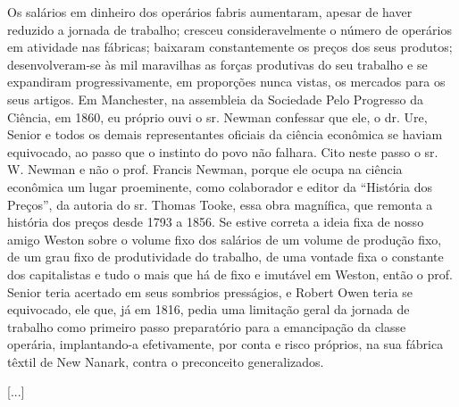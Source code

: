 Os salários em dinheiro dos operários fabris aumentaram, apesar de haver reduzido a jornada de trabalho; cresceu consideravelmente o número de operários em atividade nas fábricas; baixaram constantemente os preços dos seus produtos; desenvolveram-se às mil maravilhas as forças produtivas do seu trabalho e se expandiram progressivamente, em proporções nunca vistas, os mercados para os seus artigos. Em Manchester, na assembleia da Sociedade Pelo Progresso da Ciência, em 1860, eu próprio ouvi o sr. Newman confessar que ele, o dr. Ure, Senior e todos os demais representantes oficiais da ciência econômica se haviam equivocado, ao passo que o instinto do povo não falhara. Cito neste passo o sr. W. Newman e não o prof. Francis Newman, porque ele ocupa na ciência econômica um lugar proeminente, como colaborador e editor da “História dos Preços”, da autoria do sr. Thomas Tooke, essa obra magnífica, que remonta a história dos preços desde 1793 a 1856. Se estive correta a ideia fixa de nosso amigo Weston sobre o volume fixo dos salários de um volume de produção fixo, de um grau fixo de produtividade do trabalho, de uma vontade fixa o constante dos capitalistas e tudo o mais que há de fixo e imutável em Weston, então o prof. Senior teria acertado em seus sombrios presságios, e Robert Owen teria se equivocado, ele que, já em 1816, pedia uma limitação geral da jornada de trabalho como primeiro passo preparatório para a emancipação da classe operária, implantando-a efetivamente, por conta e risco próprios, na sua fábrica têxtil de New Nanark, contra o preconceito generalizados.

[...]
